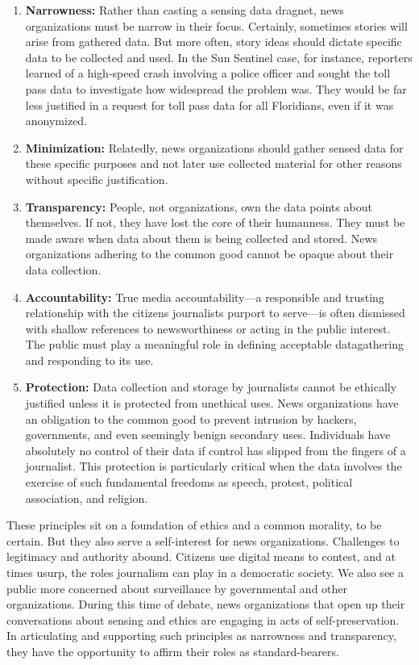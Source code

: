 \begin{itemize}
\begin{enumerate}
\item \textbf{Narrowness:} Rather than casting a sensing data dragnet, news organizations
must be narrow in their focus. Certainly, sometimes stories will arise
from gathered data. But more often, story ideas should dictate specific data
to be collected and used. In the Sun Sentinel case, for instance, reporters
learned of a high-speed crash involving a police officer and sought the toll
pass data to investigate how widespread the problem was. They would be
far less justified in a request for toll pass data for all Floridians, even if it was
anonymized.
\item \textbf{Minimization:} Relatedly, news organizations should gather sensed data
for these specific purposes and not later use collected material for other
reasons without specific justification.
\item \textbf{Transparency:} People, not organizations, own the data points about
themselves. If not, they have lost the core of their humanness. They must
be made aware when data about them is being collected and stored. News
organizations adhering to the common good cannot be opaque about their
data collection.
\item \textbf{Accountability:} True media accountability—a responsible and trusting
relationship with the citizens journalists purport to serve—is often dismissed
with shallow references to newsworthiness or acting in the public
interest. The public must play a meaningful role in defining acceptable datagathering
and responding to its use.
\item \textbf{Protection:} Data collection and storage by journalists cannot be ethically
justified unless it is protected from unethical uses. News organizations
have an obligation to the common good to prevent intrusion by hackers,
governments, and even seemingly benign secondary uses. Individuals have
absolutely no control of their data if control has slipped from the fingers of a
journalist. This protection is particularly critical when the data involves the
exercise of such fundamental freedoms as speech, protest, political association,
and religion.
\end{enumerate}

These principles sit on a foundation of ethics and a common morality, to
be certain. But they also serve a self-interest for news organizations. Challenges
to legitimacy and authority abound. Citizens use digital means to
contest, and at times usurp, the roles journalism can play in a democratic
society. We also see a public more concerned about surveillance by governmental
and other organizations. During this time of debate, news organizations
that open up their conversations about sensing and ethics are engaging
in acts of self-preservation. In articulating and supporting such principles
as narrowness and transparency, they have the opportunity to affirm their
roles as standard-bearers.


\end{itemize}
